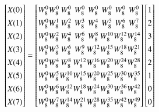 \documentclass[journal,12pt,twocolumn]{IEEEtran}
\renewcommand\thesection{\arabic{section}}
\begin{document}
\begin{enumerate}[label=\thesection.\arabic*.,ref=\thesection.\theenumi]
\begin{equation}
\renewcommand{\arraystretch}{1.35}
\setlength\arraycolsep{0.05pt}
\begin{bmatrix}
X(0) \\
X(1) \\
X(2) \\
X(3) \\
X(4) \\
X(5) \\
X(6) \\
X(7)
\end{bmatrix}
=
\begin{bmatrix}
W^{0}_{8} & W^{0}_{8} & W^{0}_{8} & W^{0}_{8} & W^{0}_{8} & W^{0}_{8} & W^{0}_{8} & W^{0}_{8}\\
W^{0}_{8} & W^{1}_{8} & W^{2}_{8} & W^{3}_{8} & W^{4}_{8} & W^{5}_{8} & W^{6}_{8} & W^{7}_{8}\\
W^{0}_{8} & W^{2}_{8} & W^{4}_{8} & W^{6}_{8} & W^{8}_{8} & W^{10}_{8} & W^{12}_{8} & W^{14}_{8}\\
W^{0}_{8} & W^{3}_{8} & W^{6}_{8} & W^{9}_{8} & W^{12}_{8} & W^{15}_{8} & W^{18}_{8} & W^{21}_{8}\\
W^{0}_{8} & W^{4}_{8} & W^{8}_{8} & W^{12}_{8} & W^{16}_{8} & W^{20}_{8} & W^{24}_{8} & W^{28}_{8}\\
W^{0}_{8} & W^{5}_{8} & W^{10}_{8} & W^{15}_{8} & W^{20}_{8} & W^{25}_{8} & W^{30}_{8} & W^{35}_{8}\\
W^{0}_{8} & W^{6}_{8} & W^{12}_{8} & W^{18}_{8} & W^{24}_{8} & W^{30}_{8} & W^{36}_{8} & W^{42}_{8}\\
W^{0}_{8} & W^{7}_{8} & W^{14}_{8} & W^{21}_{8} & W^{28}_{8} & W^{35}_{8} & W^{42}_{8} & W^{49}_{8}
\end{bmatrix}
\begin{bmatrix}
1 \\
2 \\
3 \\
4 \\
2 \\
1 \\
0 \\
0
\end{bmatrix}
\end{equation}




\end{enumerate}
\end{document}
